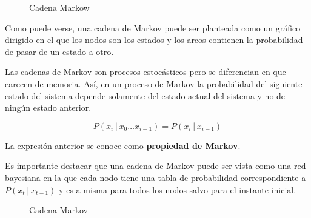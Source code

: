 \documentclass[
  a4paper,
  DIV=11,
  numbers=noendperiod]{scrreprt}
\begin{document}
\begin{figure}


\caption{\label{fig-cadena_markov.jpg}Cadena Markow}

\end{figure}%

Como puede verse, una cadena de Markov puede ser planteada como un
gráfico dirigido en el que los nodos son los estados y los arcos
contienen la probabilidad de pasar de un estado a otro.

Las cadenas de Markov son procesos estocásticos pero se diferencian en
que carecen de memoria. Así, en un proceso de Markov la probabilidad del
siguiente estado del sistema depende solamente del estado actual del
sistema y no de ningún estado anterior.

\[P(x_i│x_0 … x_{i-1})= P(x_i│x_{i-1})\]

La expresión anterior se conoce como \textbf{propiedad de Markov}.

Es importante destacar que una cadena de Markov puede ser vista como una
red bayesiana en la que cada nodo tiene una tabla de probabilidad
correspondiente a \(P(x_t│x_{t-1})\) y es a misma para todos los nodos
salvo para el instante inicial.

\begin{figure}


\caption{\label{fig-topologia_cadena_markov2.jpg}Cadena Markov}

\end{figure}%
\end{document}
